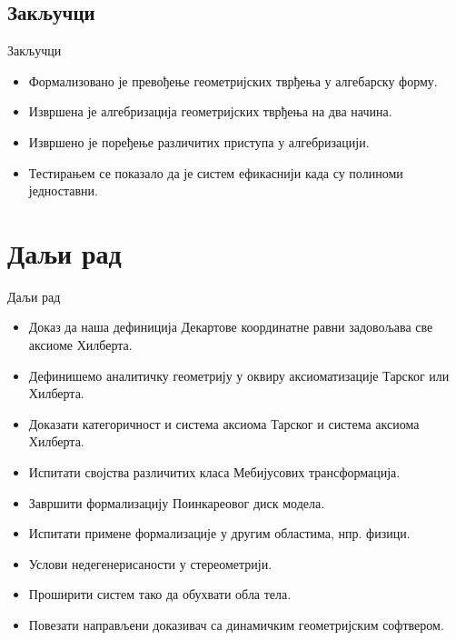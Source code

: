 \documentclass[slidestop, compress, mathserif, containsverbatim, xcolor=dvipsnames]{beamer}
\begin{document}
\subsection*{Закључци}

\begin{frame}{Закључци}
  \begin{itemize}
   \item Формализовано је превођење геометријских тврђења у алгебарску
     форму.
   \item Извршена је алгебризација геометријских тврђења на два начина.
   \item Извршено је поређење различитих приступа у алгебризацији.
   \item Тестирањем се показало да је систем ефикаснији када су полиноми
     једноставни.
  \end{itemize}
\end{frame}


\section{Даљи рад}

\begin{frame}[shrink]{Даљи рад}
  \begin{itemize}
  \item Доказ да наша дефиниција Декартове координатне равни
    задовољава све аксиоме Хилберта.
  \item Дефинишемо аналитичку геометрију у оквиру аксиоматизације
    Тарског или Хилберта.
  \item Доказати категоричност и система аксиома Тарског и система
    аксиома Хилберта.
  \item Испитати својства различитих класа Мебијусових трансформација.
  \item Завршити формализацију Поинкареовог диск модела.
  \item Испитати примене формализације у другим областима,
    нпр. физици.
  \item Услови недегенерисаности у стереометрији.
  \item Проширити систем тако да обухвати обла тела.
  \item Повезати направљени доказивач са динамичким геометријским
    софтвером.
  \end{itemize}
\end{frame}
\end{document}
